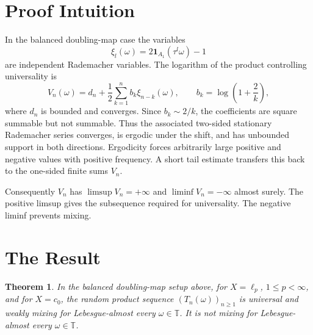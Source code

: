 \documentclass[11pt]{article}
\newtheorem{theorem}{Theorem}
\newcommand{\T}{\mathbb T}
\newcommand{\one}{\mathbf 1}
\begin{document}
\section*{Proof Intuition}

In the balanced doubling-map case the variables
\[
  \xi_l(\omega)=2\one_{A_1}(\tau^l\omega)-1
\]
are independent Rademacher variables.  The logarithm of the product controlling
universality is
\[
  V_n(\omega)=d_n+\frac12\sum_{k=1}^{n} b_k \xi_{n-k}(\omega),
  \qquad b_k=\log\left(1+\frac2k\right),
\]
where \(d_n\) is bounded and converges.  Since \(b_k\sim 2/k\), the coefficients
are square summable but not summable.  Thus the associated two-sided stationary
Rademacher series converges, is ergodic under the shift, and has unbounded
support in both directions.  Ergodicity forces arbitrarily large positive and
negative values with positive frequency.  A short tail estimate transfers this
back to the one-sided finite sums \(V_n\).

Consequently \(V_n\) has \(\limsup V_n=+\infty\) and
\(\liminf V_n=-\infty\) almost surely.  The positive limsup gives the
subsequence required for universality.  The negative liminf prevents mixing.

\section*{The Result}

\begin{theorem}
\label{thm:main}
In the balanced doubling-map setup above, for \(X=\ell_p\),
\(1\le p<\infty\), and for \(X=c_0\), the random product sequence
\((T_n(\omega))_{n\ge1}\) is universal and weakly mixing for Lebesgue-almost
every \(\omega\in\T\).  It is not mixing for Lebesgue-almost every
\(\omega\in\T\).
\end{theorem}
\end{document}
